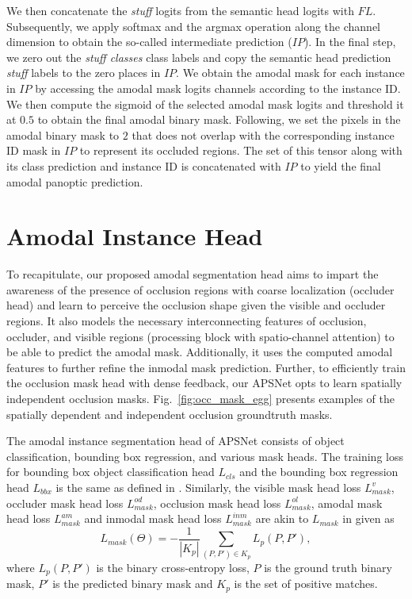 \documentclass[10pt,twocolumn,letterpaper]{article}
\newcommand{\figref}[1]{Fig.~\ref{#1}}
\begin{document}
We then concatenate the \textit{stuff} logits from the semantic head logits with $FL$. Subsequently, we apply softmax and the argmax operation along the channel dimension to obtain the so-called intermediate prediction ($IP$). In the final step, we zero out the \textit{stuff classes} class labels and copy the semantic head prediction \textit{stuff} labels to the zero places in $IP$.  We obtain the amodal mask for each instance in $IP$ by accessing the amodal mask logits channels according to the instance ID. We then compute the sigmoid of the selected amodal mask logits and threshold it at $0.5$ to obtain the final amodal binary mask. Following, we set the pixels in the amodal binary mask to $2$ that does not overlap with the corresponding instance ID mask in $IP$ to represent its occluded regions. The set of this tensor along with its class prediction and instance ID is concatenated with $IP$ to yield the final amodal panoptic prediction.

\section{Amodal Instance Head}
\label{sec:supp_amodal}

To recapitulate, our proposed amodal segmentation head aims to impart the awareness of the presence of occlusion regions with coarse localization (occluder head) and learn to perceive the occlusion shape given the visible and occluder regions. It also models the necessary interconnecting features of occlusion, occluder, and visible regions (processing block with spatio-channel attention) to be able to predict the amodal mask. Additionally, it uses the computed amodal features to further refine the inmodal mask prediction. Further, to efficiently train the occlusion mask head with dense feedback, our APSNet opts to learn spatially independent occlusion masks. \figref{fig:occ_mask_egg} presents examples of the spatially dependent and independent occlusion groundtruth masks.

The amodal instance segmentation head of APSNet consists of object classification, bounding box regression, and various mask heads.  
The training loss for bounding box object classification head ${L}_{cls}$ and the bounding box regression head ${L}_{bbx}$ is the same as defined in \cite{mohan2020efficientps}. Similarly, the visible mask head loss ${L}_{mask}^{v}$, occluder mask head loss ${L}_{mask}^{od}$, occlusion mask head loss ${L}_{mask}^{ol}$, amodal mask head loss ${L}_{mask}^{am}$ and inmodal mask head loss ${L}_{mask}^{inm}$ are akin to ${L}_{mask}$ in \cite{mohan2020efficientps} given as
\begin{equation}
{L}_{mask}(\Theta) = -\frac{1}{|K_p|}\sum_{(P,P')\in K_p}L_{p}(P,P'),
\label{eq:mask}
\end{equation}
where $L_{p}(P,P')$ is the binary cross-entropy loss, $P$ is the ground truth binary mask, $P'$ is the predicted binary mask and $K_p$ is the set of positive matches.
\end{document}
